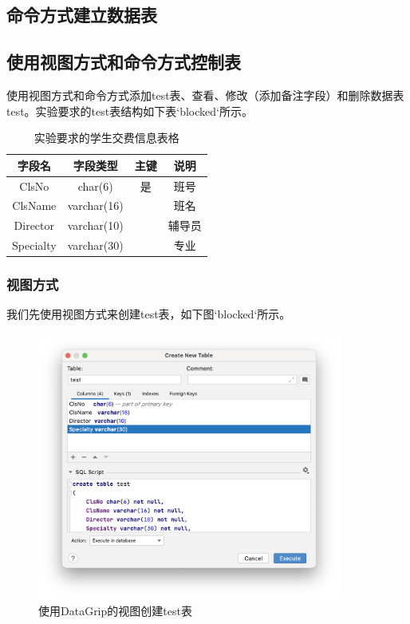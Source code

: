 \documentclass[a4paper,UTF8,heading=false,12pt]{article}
\begin{document}
    \subsection{命令方式建立数据表}

    \subsection{使用视图方式和命令方式控制表}

    使用视图方式和命令方式添加test表、查看、修改（添加备注字段）和删除数据表test。实验要求的test表结构如下表`blocked`所示。

    \begin{table}[htbp]
        \begin{center}
            \begin{tabular}{@{}cccc@{}}
            \toprule
            字段名  & 字段类型  & 主键 & 说明 \\ \midrule
            ClsNo   & char(6) & 是 & 班号    \\
            ClsName & varchar(16) &  & 班名    \\
            Director & varchar(10) &  & 辅导员    \\
            Specialty   & varchar(30) &  & 专业    \\
            \bottomrule
            \end{tabular}
            \caption{实验要求的学生交费信息表格}
        \end{center}
    \end{table}

    \subsubsection{视图方式}

    我们先使用视图方式来创建test表，如下图`blocked`所示。

    \begin{figure}[htbp]
        \centering
        \includegraphics[width=10cm]{../Images/TestTable_OnCreate.png}
        \caption{使用DataGrip的视图创建test表}
    \end{figure}
\end{document}
